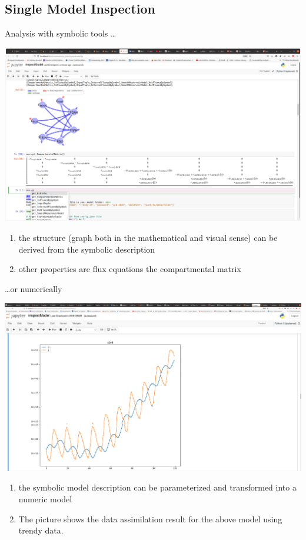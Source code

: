 \documentclass[96pt]{article}
\begin{document}
\begin{tcbposter}
{\begin{multicols*}{4}
\subsection{Single Model Inspection}
\begin{mybox}{Analysis with symbolic tools \dots}
\end{mybox}
	\includegraphics[width=\columnwidth]{mvsTabScreen.png}
	\begin{enumerate}
	\item 
	the structure (graph both in the mathematical and visual sense) can be derived from the symbolic description
	\item other properties are flux equations the compartmental matrix

	\end{enumerate}

\begin{mybox}{\dots or numerically }
\end{mybox}
	\includegraphics[width=\columnwidth]{DataAssimilation.png}
	\begin{enumerate}
	\item 
	the symbolic model description can be parameterized and transformed into a numeric model
	\item The picture shows the data assimilation result for the above model using trendy data.
	\end{enumerate}


\end{multicols*}}
\end{tcbposter}
\end{document}
